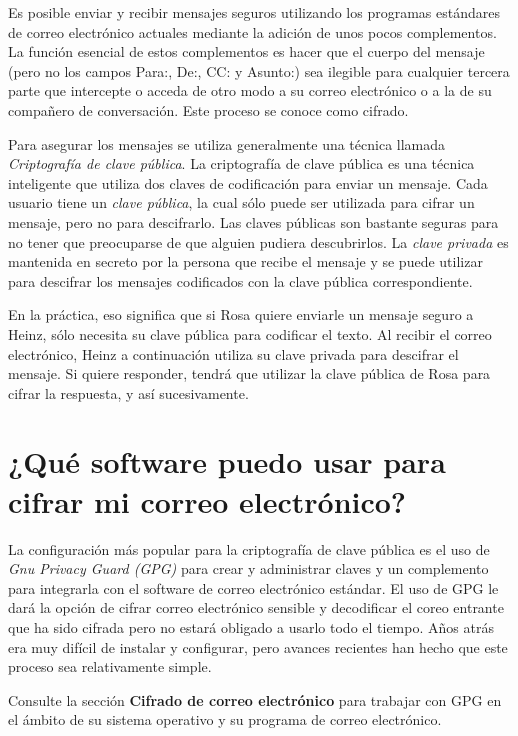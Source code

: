 \documentclass[10pt,a5paper,twoside,,]{book}
\begin{document}
Es posible enviar y recibir mensajes seguros utilizando los programas
estándares de correo electrónico actuales mediante la adición de unos
pocos complementos. La función esencial de estos complementos es hacer
que el cuerpo del mensaje (pero no los campos Para:, De:, CC: y Asunto:)
sea ilegible para cualquier tercera parte que intercepte o acceda de
otro modo a su correo electrónico o a la de su compañero de
conversación. Este proceso se conoce como cifrado.

Para asegurar los mensajes se utiliza generalmente una técnica llamada
\emph{Criptografía de clave pública}. La criptografía de clave pública
es una técnica inteligente que utiliza dos claves de codificación para
enviar un mensaje. Cada usuario tiene un \emph{clave pública}, la cual
sólo puede ser utilizada para cifrar un mensaje, pero no para
descifrarlo. Las claves públicas son bastante seguras para no tener que
preocuparse de que alguien pudiera descubrirlos. La \emph{clave privada}
es mantenida en secreto por la persona que recibe el mensaje y se puede
utilizar para descifrar los mensajes codificados con la clave pública
correspondiente.

En la práctica, eso significa que si Rosa quiere enviarle un mensaje
seguro a Heinz, sólo necesita su clave pública para codificar el texto.
Al recibir el correo electrónico, Heinz a continuación utiliza su clave
privada para descifrar el mensaje. Si quiere responder, tendrá que
utilizar la clave pública de Rosa para cifrar la respuesta, y así
sucesivamente.

\section{¿Qué software puedo usar para cifrar mi correo
electrónico?}\label{quuxe9-software-puedo-usar-para-cifrar-mi-correo-electruxf3nico}

La configuración más popular para la criptografía de clave pública es el
uso de \emph{Gnu Privacy Guard (GPG)} para crear y administrar claves y
un complemento para integrarla con el software de correo electrónico
estándar. El uso de GPG le dará la opción de cifrar correo electrónico
sensible y decodificar el coreo entrante que ha sido cifrada pero no
estará obligado a usarlo todo el tiempo. Años atrás era muy difícil de
instalar y configurar, pero avances recientes han hecho que este proceso
sea relativamente simple.

Consulte la sección \textbf{Cifrado de correo electrónico} para trabajar
con GPG en el ámbito de su sistema operativo y su programa de correo
electrónico.
\end{document}
